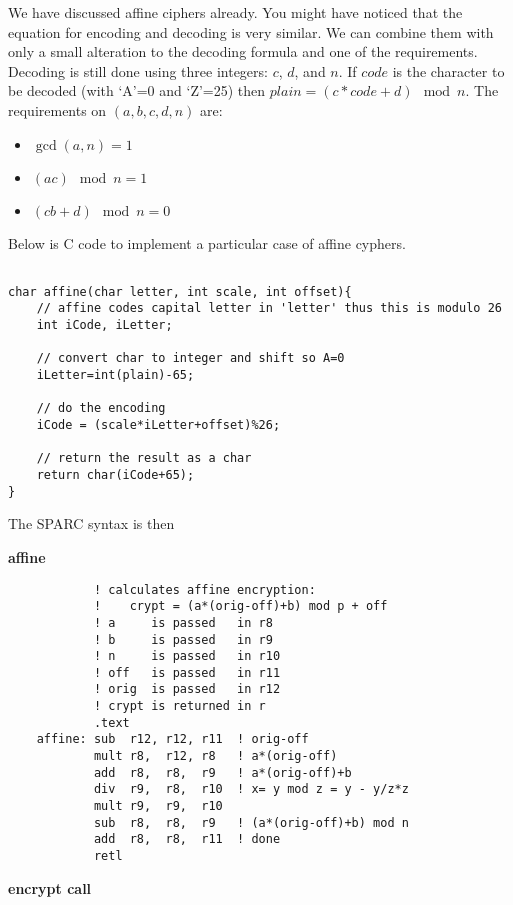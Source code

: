 We have discussed affine ciphers already.  You might have noticed that the equation for encoding and decoding is very similar.  We can combine them with only a small alteration to the decoding formula and one of the requirements.  Decoding is still done using three integers: $c$, $d$, and $n$.  If $code$ is the character to be decoded (with `A'=0 and `Z'=25) then $plain=(c*code+d) \mod n$.  The requirements on $(a,b,c,d,n)$ are:
\begin{itemize}
    \item $\gcd(a,n)=1$
    \item $(ac) \mod n = 1$
    \item $(cb+d) \mod n = 0$
\end{itemize}
Below is C code to implement a particular case of affine cyphers.
\begin{verbatim}

char affine(char letter, int scale, int offset){
    // affine codes capital letter in 'letter' thus this is modulo 26
    int iCode, iLetter;

    // convert char to integer and shift so A=0
    iLetter=int(plain)-65;

    // do the encoding
    iCode = (scale*iLetter+offset)%26;

    // return the result as a char
    return char(iCode+65);
}

\end{verbatim}

The SPARC syntax is then


    \textbf{affine}

    \begin{verbatim}
            ! calculates affine encryption:
            !    crypt = (a*(orig-off)+b) mod p + off
            ! a     is passed   in r8
            ! b     is passed   in r9
            ! n     is passed   in r10
            ! off   is passed   in r11
            ! orig  is passed   in r12
            ! crypt is returned in r
            .text
    affine: sub  r12, r12, r11  ! orig-off
            mult r8,  r12, r8   ! a*(orig-off)
            add  r8,  r8,  r9   ! a*(orig-off)+b
            div  r9,  r8,  r10  ! x= y mod z = y - y/z*z
            mult r9,  r9,  r10
            sub  r8,  r8,  r9   ! (a*(orig-off)+b) mod n
            add  r8,  r8,  r11  ! done
            retl
    \end{verbatim}


    \textbf{encrypt call}

